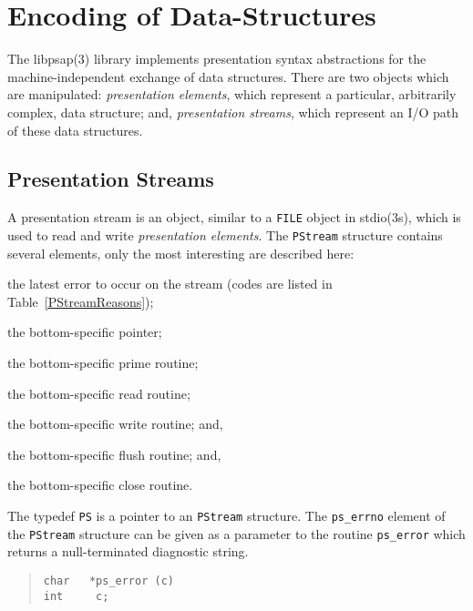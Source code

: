 

\chapter	{Encoding of Data-Structures}\label{libpsap}
The \man libpsap(3) library implements presentation syntax abstractions
for the machine-independent exchange of data structures.
There are two objects which are manipulated:
{\em presentation elements},
which represent a particular, arbitrarily complex, data structure;
and,
{\em presentation streams},
which represent an I/O path of these data structures.

\section	{Presentation Streams}
A presentation stream is an object,
similar to a \verb"FILE" object in \man stdio(3s),
which is used to read and write {\em presentation elements}.
The \verb"PStream" structure contains several elements,
only the most interesting are described here:
\begin{describe}
\item[\verb"ps\_errno":] the latest error to occur on the stream
(codes are listed in Table~\ref{PStreamReasons});

\item[\verb"ps\_addr":] the bottom-specific pointer;

\item[\verb"ps\_primeP":] the bottom-specific prime routine;

\item[\verb"ps\_readP":] the bottom-specific read routine;

\item[\verb"ps\_writeP":] the bottom-specific write routine;
and,

\item[\verb"ps\_flushP":] the bottom-specific flush routine;
and,

\item[\verb"ps\_closeP":] the bottom-specific close routine.
\end{describe}
The typedef \verb"PS" is a pointer to an \verb"PStream" structure.
The \verb"ps_errno" element of the \verb"PStream" structure can be given as a
parameter to the routine \verb"ps_error" which returns a
null-terminated diagnostic string.
\begin{quote}\small\begin{verbatim}
char   *ps_error (c)
int     c;
\end{verbatim}\end{quote}

